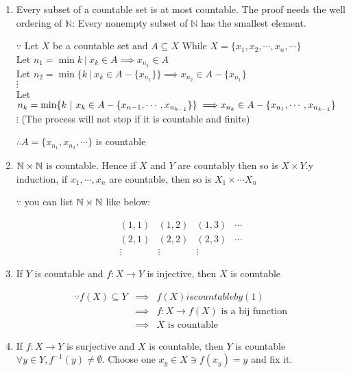 \begin{enumerate}[wide,label = \textbf{($\arabic*$). }]
	\item Every subset of a countable set is at most countable. The proof needs the well ordering of $\mathbb N$: Every nonempty subset of $\mathbb N$ has the smallest element.
	
	$\because$ Let $X$ be a countable set and $A \subseteq X$ While $X = \{x_1,x_2,\cdots,x_n,\cdots\}$\\
	Let $n_1 = \min{k ~|~ x_k \in A} \implies x_{n_1} \in A$\\
	Let $n_2 = \min \{k~|~ x_k \in A - \{x_{n_1}\}\} \implies x_{n_2} \in A - \{x_{n_1}\}$\\
	$\vdots$\\
	Let $n_k = \min \{k~|~x_k \in A - \{x_{n-1},\cdots,x_{n_{k-1}}\}\} \implies \\ x_{n_k} \in A - \{x_{n_1},\cdots,x_{n_{k-1}}\}$\\
	$\vdots$ (The process will not stop if it is countable and finite)
	
	$\therefore A = \{x_{n_1},x_{n_2},\cdots\}$ is countable
	
	\item $\mathbb{N} \times \mathbb{N}$ is countable. Hence if $X$ and $Y$ are countably then so is $X \times Y$.y induction, if $x_1,\cdots,x_n$ are countable, then so is $X_1 \times \cdots X_n$
	
	$\because$ you can list $ \mathbb{N} \times \mathbb{N}$ like below:
	
	$$\begin{matrix}
		(1,1) & (1,2) & (1,3) & \cdots \\
		(2,1) & (2,2) & (2,3) & \cdots \\
		\vdots & \vdots & \vdots 
	\end{matrix}$$
	
	\item If $Y$ is countable and $f:X \rightarrow Y$ is injective, then $X$ is countable
	
	\begin{eqnarray*}
		\because f(X) \subseteq Y &\implies& f(X) is countable by (1)\\
		&\implies&f: X \rightarrow f(X) \text{ is a bij function}\\
		&\implies& X \text{ is countable}
	\end{eqnarray*}
	
	\item If $f:X \rightarrow Y$ is surjective and $X$ is countable, then $Y$ is countable $\forall y \in Y, f^{-1}(y) \neq \emptyset$. Choose one $x_y \in X \ni f(x_y) = y$ and fix it.
	

\end{enumerate}
